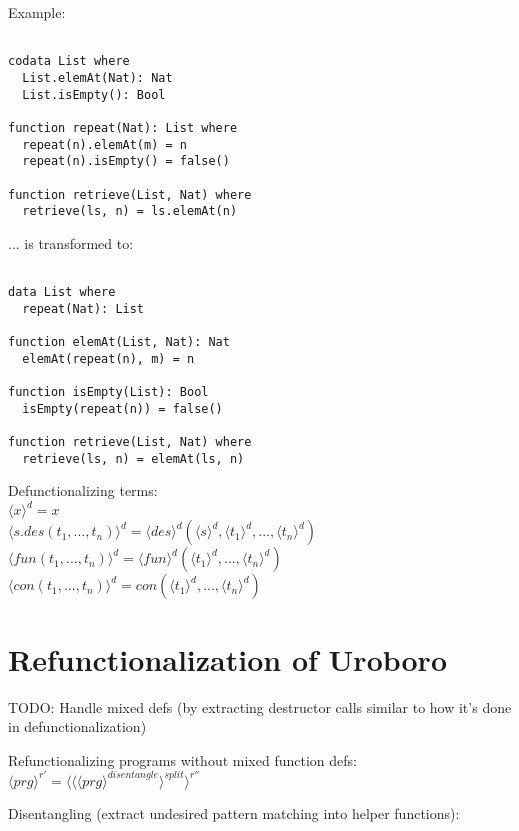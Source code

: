 \documentclass[11pt]{article} %
\begin{document}
Example:

\begin{lstlisting}

codata List where
  List.elemAt(Nat): Nat
  List.isEmpty(): Bool

function repeat(Nat): List where
  repeat(n).elemAt(m) = n
  repeat(n).isEmpty() = false()

function retrieve(List, Nat) where
  retrieve(ls, n) = ls.elemAt(n)

\end{lstlisting}

... is transformed to:

\begin{lstlisting}

data List where
  repeat(Nat): List

function elemAt(List, Nat): Nat
  elemAt(repeat(n), m) = n

function isEmpty(List): Bool
  isEmpty(repeat(n)) = false()

function retrieve(List, Nat) where
  retrieve(ls, n) = elemAt(ls, n)

\end{lstlisting}

Defunctionalizing terms: \\
$\langle x \rangle^d = x$ \\
$\langle s.des(t_1, ..., t_n) \rangle^d = \langle des \rangle^d (\langle s \rangle^d, \langle t_1 \rangle^d, ..., \langle t_n \rangle^d)$ \\
$\langle fun(t_1, ..., t_n) \rangle^d = \langle fun \rangle^d (\langle t_1 \rangle^d, ..., \langle t_n \rangle^d)$ \\
$\langle con(t_1, ..., t_n) \rangle^d = con(\langle t_1 \rangle^d, ..., \langle t_n \rangle^d)$ \\

\section{Refunctionalization of Uroboro}

TODO: Handle mixed defs (by extracting destructor calls similar to how it's done in defunctionalization)

Refunctionalizing programs without mixed function defs: $\langle prg \rangle^{r'} = \langle \langle \langle prg \rangle^{disentangle} \rangle^{split} \rangle^{r''}$

Disentangling (extract undesired pattern matching into helper functions):
\end{document}
